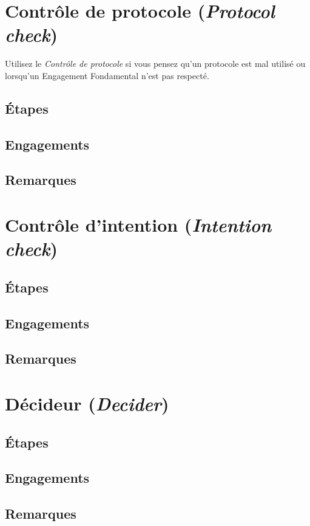 \documentclass{book}
\begin{document}
\section{Contrôle de protocole (\emph{Protocol check})}

Utilisez le \emph{Contrôle de protocole} si vous pensez qu'un protocole est mal utilisé ou lorsqu'un Engagement Fondamental n'est pas
respecté.

\subsection{Étapes}
\subsection{Engagements}
\subsection{Remarques}

\section{Contrôle d'intention (\emph{Intention check})}
\subsection{Étapes}
\subsection{Engagements}
\subsection{Remarques}

\section{Décideur (\emph{Decider})}
\subsection{Étapes}
\subsection{Engagements}
\subsection{Remarques}
\end{document}
